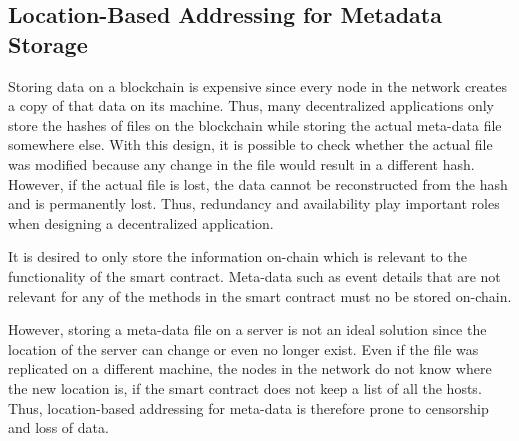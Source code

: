 
\subsection{Location-Based Addressing for Metadata Storage}\label{subsection:metadata-storage}

Storing data on a blockchain is expensive since every node in the network creates a copy of that data on its machine. Thus, many decentralized applications only store the hashes of files on the blockchain while storing the actual meta-data file somewhere else. With this design, it is possible to check whether the actual file was modified because any change in the file would result in a different hash. However, if the actual file is lost, the data cannot be reconstructed from the hash and is permanently lost. Thus, redundancy and availability play important roles when designing a decentralized application.

It is desired to only store the information on-chain which is relevant to the functionality of the smart contract. Meta-data such as event details that are not relevant for any of the methods in the smart contract must no be stored on-chain.

However, storing a meta-data file on a server is not an ideal solution since the location of the server can change or even no longer exist. Even if the file was replicated on a different machine, the nodes in the network do not know where the new location is, if the smart contract does not keep a list of all the hosts. Thus, location-based addressing for meta-data is therefore prone to censorship and loss of data. 
